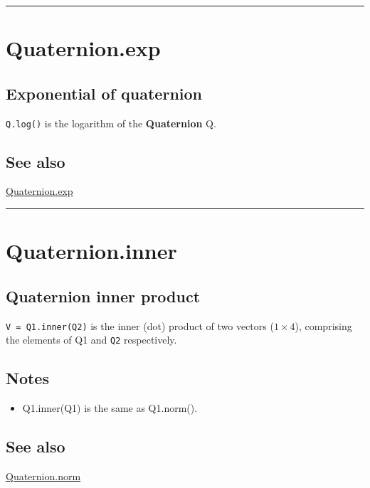 \vspace{1.5ex}\hrule

\hypertarget{Quaternion.exp}{\section*{Quaternion.exp}}
\subsection*{Exponential of quaternion}


\texttt{Q.log()} is the logarithm of the \textbf{\color{red} Quaternion} Q.


\subsection*{See also}


\hyperlink{Quaternion.exp}{\color{blue} Quaternion.exp}

\vspace{1.5ex}\hrule

\hypertarget{Quaternion.inner}{\section*{Quaternion.inner}}
\subsection*{Quaternion inner product}


\texttt{V = Q1.inner(Q2)} is the inner (dot) product of two vectors ($1 \times 4$),
comprising the elements of Q1 and \texttt{Q2} respectively.


\subsection*{Notes}
\begin{itemize}
  \item Q1.inner(Q1) is the same as Q1.norm().
\end{itemize}

\subsection*{See also}


\hyperlink{Quaternion.norm}{\color{blue} Quaternion.norm}

